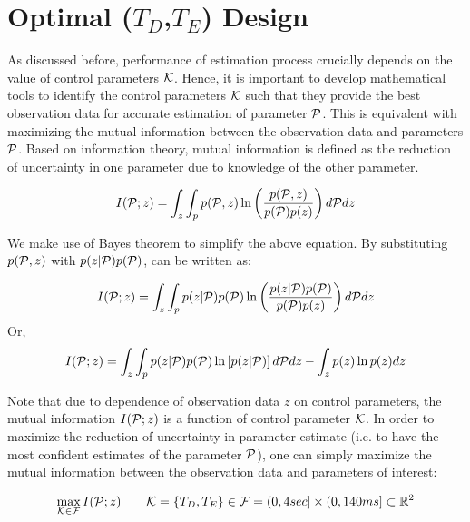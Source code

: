 \documentclass{article}         %
\theoremstyle{definition}
\theoremstyle{remark}
\begin{document}
\section{Optimal ($T_D$,$T_E$) Design}\label{oed}
As discussed before, performance of estimation process crucially depends on the
value of control parameters $\mathcal{K}$. Hence, it is important to develop
mathematical tools to identify the control parameters $\mathcal{K}$ such that they
provide the best observation data for accurate estimation of parameter $\mathcal{P}$.
This is equivalent with maximizing the mutual information between the
observation data and parameters $\mathcal{P}$. Based on information theory, mutual
information is defined as the reduction of uncertainty in one parameter due to
knowledge of the other parameter.

\begin{equation} \label{mi}
I(\mathcal{P};z)=\int_z\int_p p(\mathcal{P},z)\ln\left(\frac{p(\mathcal{P},z)}{p(\mathcal{P})p(z)}\right)d\mathcal{P} dz
\end{equation}

We make use of Bayes theorem to simplify the above equation. By substituting $p(\mathcal{P},z)$ with $p(z|\mathcal{P})p(\mathcal{P})$,  can be written as:

\begin{equation} \label{mi2}
I(\mathcal{P};z)=\int_z\int_p p(z|\mathcal{P})p(\mathcal{P})\ln\left(\frac{p(z|\mathcal{P})p(\mathcal{P})}{p(\mathcal{P})p(z)}\right)d\mathcal{P} dz
\end{equation}
Or,
\begin{equation} \label{mi3}
I(\mathcal{P};z)=\int_z\int_p p(z|\mathcal{P})p(\mathcal{P})\ln\left[p(z|\mathcal{P})\right]d\mathcal{P} dz - \int_z p(z) \ln p(z)dz
\end{equation}



Note that due to dependence of observation data $z$ on control parameters, the mutual information $I(\mathcal{P};z)$ is a function of control parameter $\mathcal{K}$. In order to maximize the reduction of uncertainty in parameter estimate (i.e. to have the most confident estimates of the parameter $\mathcal{P}$), one can simply maximize the mutual information between the observation data and parameters of interest:

\begin{equation}\label{mimax}
\max_{\mathcal{K} \in \mathcal{F}} I(\mathcal{P};z)
\qquad
\mathcal{K}=\{T_D,T_E\} \in \mathcal{F} = (0,4sec] \times (0,140ms] \subset \mathbb{R}^2 
\end{equation}
\end{document}
